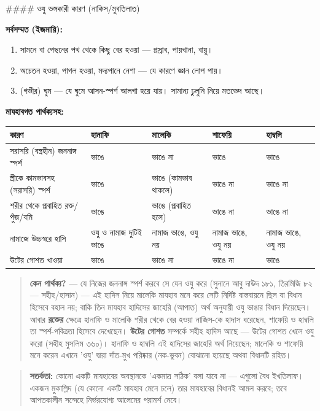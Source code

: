 \#\#\#\# ওযু ভঙ্গকারী কারণ (নাকিস/মুবতিলাত)

\textbf{সর্বসম্মত (ইজমায়ি):}
\begin{enumerate}
\item সামনে বা পেছনের পথ থেকে কিছু বের হওয়া — প্রস্রাব, পায়খানা, বায়ু।
\item অচেতন হওয়া, পাগল হওয়া, মদ্যপানে নেশা — যে কারণে জ্ঞান লোপ পায়।
\item (গভীর) ঘুম — যে ঘুমে আসন-স্পর্শ আলগা হয়ে যায়। সামান্য ঢুলুনি নিয়ে মতভেদ আছে।
\end{enumerate}
\textbf{মাযহাবগত পার্থক্যসহ:}

\begin{table}[h]\centering\small
\begin{tabular}{lllll}
কারণ & হানাফি & মালেকি & শাফেয়ি & হাম্বলি \\
\hline
সরাসরি (বস্ত্রহীন) জননাঙ্গ স্পর্শ & ভাঙে & ভাঙে না & ভাঙে & ভাঙে \\
স্ত্রীকে কামভাবসহ (সরাসরি) স্পর্শ & ভাঙে & ভাঙে (কামভাব থাকলে) & ভাঙে না & ভাঙে না \\
শরীর থেকে প্রবাহিত রক্ত/পুঁজ/বমি & ভাঙে & ভাঙে (প্রবাহিত হলে) & ভাঙে না & ভাঙে না \\
নামাজে উচ্চস্বরে হাসি & ওযু ও নামাজ দুটিই ভাঙে & নামাজ ভাঙে, ওযু নয় & নামাজ ভাঙে, ওযু নয় & নামাজ ভাঙে, ওযু নয় \\
উটের গোশত খাওয়া & ভাঙে & ভাঙে না & ভাঙে না & ভাঙে \\
\hline
\end{tabular}
\end{table}

\begin{quote}
\textbf{কেন পার্থক্য?} — যে নিজের জননাঙ্গ স্পর্শ করবে সে যেন ওযু করে (সুনানে আবু দাউদ ১৮১, তিরমিজি ৮২ — সহীহ/হাসান) — এই হাদিস নিয়ে মালেকি মাযহাব মনে করে সেটি নির্দিষ্ট বাস্তবায়নে ছিল বা বিধান হিসেবে বহাল নয়; বাকি তিন মাযহাব হাদিসের জাহেরি (আপাত) অর্থ অনুযায়ী ওযু ভাঙার বিধান দিয়েছেন। আবার \textbf{রক্তের} ক্ষেত্রে হানাফি ও মালেকি শরীর থেকে বের হওয়া নাজিস-কে হাদাস ধরেছেন, শাফেয়ি ও হাম্বলি তা স্পর্শ-পবিত্রতা হিসেবে দেখেছেন। \textbf{উটের গোশত} সম্পর্কে সহীহ হাদিস আছে — উটের গোশত খেলে ওযু করো (সহীহ মুসলিম ৩৬০)। হানাফি ও হাম্বলি এই হাদিসের জাহেরি অর্থ নিয়েছেন; মালেকি ও শাফেয়ি মনে করেন এখানে 'ওযু' দ্বারা দাঁত-মুখ পরিষ্কার (নক-ভুবন) বোঝানো হয়েছে অথবা বিধানটি রহিত।
\end{quote}

\begin{quote}
\textbf{সতর্কতা:} কোনো একটি মাযহাবের অবস্থানকে 'একমাত্র সঠিক' বলা যাবে না — এগুলো বৈধ ইখতিলাফ। একজন মুকাল্লিদ (যে কোনো একটি মাযহাব মেনে চলে) তার মাযহাবের বিধানই আমল করবে; তবে আপতকালীন সন্দেহে নির্ভরযোগ্য আলেমের পরামর্শ নেবে।
\end{quote}

